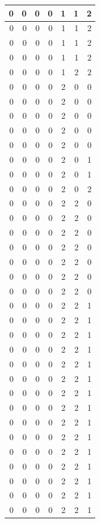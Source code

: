 \documentclass[
  12pt,
]{krantz}
\begin{document}
\begin{tabular}{r|r|r|r|r|r|r}
\hline
0 & 0 & 0 & 0 & 1 & 1 & 2\\
\hline
0 & 0 & 0 & 0 & 1 & 1 & 2\\
\hline
0 & 0 & 0 & 0 & 1 & 1 & 2\\
\hline
0 & 0 & 0 & 0 & 1 & 1 & 2\\
\hline
0 & 0 & 0 & 0 & 1 & 2 & 2\\
\hline
0 & 0 & 0 & 0 & 2 & 0 & 0\\
\hline
0 & 0 & 0 & 0 & 2 & 0 & 0\\
\hline
0 & 0 & 0 & 0 & 2 & 0 & 0\\
\hline
0 & 0 & 0 & 0 & 2 & 0 & 0\\
\hline
0 & 0 & 0 & 0 & 2 & 0 & 0\\
\hline
0 & 0 & 0 & 0 & 2 & 0 & 1\\
\hline
0 & 0 & 0 & 0 & 2 & 0 & 1\\
\hline
0 & 0 & 0 & 0 & 2 & 0 & 2\\
\hline
0 & 0 & 0 & 0 & 2 & 2 & 0\\
\hline
0 & 0 & 0 & 0 & 2 & 2 & 0\\
\hline
0 & 0 & 0 & 0 & 2 & 2 & 0\\
\hline
0 & 0 & 0 & 0 & 2 & 2 & 0\\
\hline
0 & 0 & 0 & 0 & 2 & 2 & 0\\
\hline
0 & 0 & 0 & 0 & 2 & 2 & 0\\
\hline
0 & 0 & 0 & 0 & 2 & 2 & 0\\
\hline
0 & 0 & 0 & 0 & 2 & 2 & 1\\
\hline
0 & 0 & 0 & 0 & 2 & 2 & 1\\
\hline
0 & 0 & 0 & 0 & 2 & 2 & 1\\
\hline
0 & 0 & 0 & 0 & 2 & 2 & 1\\
\hline
0 & 0 & 0 & 0 & 2 & 2 & 1\\
\hline
0 & 0 & 0 & 0 & 2 & 2 & 1\\
\hline
0 & 0 & 0 & 0 & 2 & 2 & 1\\
\hline
0 & 0 & 0 & 0 & 2 & 2 & 1\\
\hline
0 & 0 & 0 & 0 & 2 & 2 & 1\\
\hline
0 & 0 & 0 & 0 & 2 & 2 & 1\\
\hline
0 & 0 & 0 & 0 & 2 & 2 & 1\\
\hline
0 & 0 & 0 & 0 & 2 & 2 & 1\\
\hline
0 & 0 & 0 & 0 & 2 & 2 & 1\\
\hline
0 & 0 & 0 & 0 & 2 & 2 & 1\\
\hline
0 & 0 & 0 & 0 & 2 & 2 & 1\\

\end{tabular}
\end{document}
